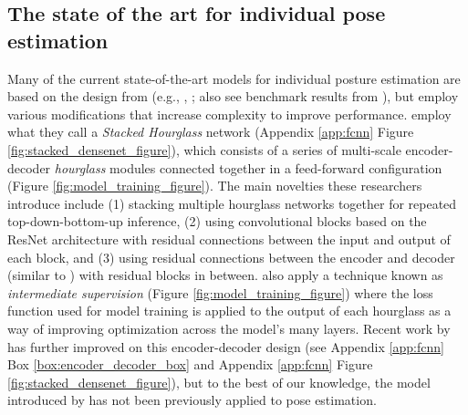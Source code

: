 \documentclass[11pt,a4paper,oneside]{article}
\begin{document}
\begin{appendices}
\label{app:sota}
\subsection{The state of the art for individual pose estimation}
Many of the current state-of-the-art models for individual posture estimation are based on the design from \cite{newell2016} (e.g., \citealt{Ke_2018_ECCV}, 
\citealt{chen2017adversarial}; also see benchmark results from \citealt{andriluka14cvpr}), but employ various modifications that increase complexity to improve performance. \cite{newell2016} employ what they call a \textit{Stacked Hourglass} network (Appendix \ref{app:fcnn} Figure \ref{fig:stacked_densenet_figure}), which consists of a series of multi-scale encoder-decoder \textit{hourglass} modules connected together in a feed-forward configuration (Figure \ref{fig:model_training_figure}). The main novelties these researchers introduce include (1) stacking multiple hourglass networks together for repeated top-down-bottom-up inference, (2) using convolutional blocks based on the ResNet architecture \citep{he2016deep} with residual connections between the input and output of each block, and (3) using residual connections between the encoder and decoder (similar to \citealt{ronneberger2015u}) with residual blocks in between. \cite{newell2016} also apply a technique known as \textit{intermediate supervision} (Figure \ref{fig:model_training_figure}) where the loss function used for model training is applied to the output of each hourglass as a way of improving optimization across the model's many layers. Recent work by \cite{Jegou16} has further improved on this encoder-decoder design (see Appendix \ref{app:fcnn} Box \ref{box:encoder_decoder_box} and Appendix \ref{app:fcnn} Figure \ref{fig:stacked_densenet_figure}), but to the best of our knowledge, the model introduced by \cite{Jegou16} has not been previously applied to pose estimation.



\label{app:overparam}

\end{appendices}
\end{document}
